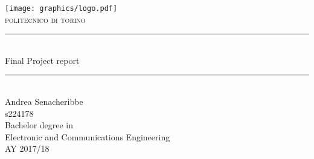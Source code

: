 \documentclass[11pt] {scrreprt}
\begin{document}
\begin{titlepage}
		\centering
		\texttt{[image: graphics/logo.pdf]}\\[0.5 cm]
		\textsc{\LARGE politecnico di torino}\\[6.5 cm]
		\rule{\linewidth}{0.2 mm} \\
		{ \huge Final Project report\\}
		\rule{\linewidth}{0.2 mm} \\[3 cm]

		
		\LARGE Andrea Senacheribbe\\
		\Large s224178\\[6cm]
	
		
		\Large Bachelor degree in\\ Electronic and Communications Engineering\\
		\Large AY 2017/18
\end{titlepage}



\end{document}
